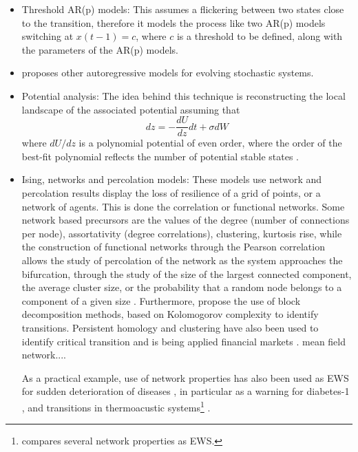 \begin{enumerate}
\begin{itemize}
	\item Threshold AR(p) models: This assumes a flickering between two states close to the transition, therefore it models the process like two AR(p) models switching at $x(t-1)=c$, where $c$ is a threshold to be defined, along with the parameters of the AR(p) models. 
	\item \cite{Laitinen2021} proposes other autoregressive models for evolving stochastic systems.
	\item Potential analysis: The idea behind this technique is reconstructing the local landscape of the associated potential assuming that 
	\begin{equation}
		dz=-\frac{dU}{dz}dt+\sigma dW
	\end{equation}
	where $dU/dz$ is a polynomial potential of even order, where the order of the best-fit polynomial reflects the number of potential stable states \citep{Livina2010,Livina2011}.

	\item Ising, networks and percolation models: These models use network and percolation results display the loss of resilience of a grid of points, or a network of agents. This is done the correlation or functional networks.
	Some network based precursors are the values of the degree (number of connections per node), assortativity (degree correlations), clustering, kurtosis rise, while the construction of functional networks through the Pearson correlation allows the study of percolation of the network as the system approaches the bifurcation,  through the study of the size of the largest connected component, the average cluster size, or the probability that a random node belongs to a component of a given size \citep{Rodriguez-Mendez2016a, Jager2017, Fullsack2022}.
	Furthermore, \citep{Dakos2017} propose the use of block decomposition methods, based on Kolomogorov complexity to identify transitions.
	Persistent homology and clustering have also been used to identify critical transition \citep{Mittal2017,Maletic2016} and is being applied  financial markets \citep{Gidea2020a,Ismail2022a}.
	\citep{Zhang2022} mean field network....
	
	As a practical example, use of network properties has also been used as EWS for sudden deterioration of diseases \citep{Chen2012a}, in particular as a warning for  diabetes-1 \citep{Liu2013}, and transitions in thermoacustic systems\footnote{\citep{Murugesan2016} compares several network properties as EWS. } \citep{Murugesan2016}.
	

\end{itemize}
\end{enumerate}
